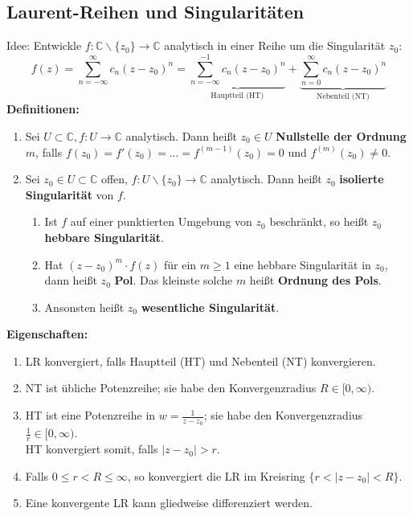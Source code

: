 \documentclass[4pt,a4paper]{scrartcl}
\begin{document}
\begin{multicols}{4}
\subsection{Laurent-Reihen und Singularitäten}
Idee: Entwickle $f:\mathbb{C}\backslash\{z_0\}\rightarrow\mathbb{C}$ analytisch in einer Reihe um die Singularität $z_0$:
\begin{equation*}
f(z)=\sum\limits_{n=-\infty}^{\infty}c_n(z-z_0)^n=\underbrace{\sum\limits_{n=-\infty}^{-1}c_n(z-z_0)^n}_{\text{Hauptteil (HT)}}+\underbrace{\sum\limits_{n=0}^{\infty}c_n(z-z_0)^n}_{\text{Nebenteil (NT)}}
\end{equation*}
\textbf{Definitionen:}
\begin{enumerate}[label=$\bullet$]
\item Sei $U\subset\mathbb{C},f:U\rightarrow\mathbb{C}$ analytisch. Dann heißt $z_0\in U$ \textbf{Nullstelle der Ordnung} $m$, falls $f(z_0)=f'(z_0)=...=f^{(m-1)}(z_0)=0$ und $f^{(m)}(z_0)\neq 0$.
\item Sei $z_0\in U\subset\mathbb{C}$ offen, $f:U\backslash\{z_0\}\rightarrow\mathbb{C}$ analytisch. Dann heißt $z_0$ \textbf{isolierte Singularität} von $f$.
\begin{enumerate}[label=-]
\item Ist $f$ auf einer punktierten Umgebung von $z_0$ beschränkt, so heißt $z_0$ \textbf{hebbare Singularität}.
\item Hat $(z-z_0)^m\cdot f(z)$ für ein $m\geq 1$ eine hebbare Singularität in $z_0$, dann heißt $z_0$ \textbf{Pol}. Das kleinste solche $m$ heißt \textbf{Ordnung des Pols}.
\item Ansonsten heißt $z_0$ \textbf{wesentliche Singularität}.
\end{enumerate}
\end{enumerate}
\textbf{Eigenschaften:}
\begin{enumerate}
\item LR konvergiert, falls Hauptteil (HT) und Nebenteil (NT) konvergieren.
\item NT ist übliche Potenzreihe; sie habe den Konvergenzradius $R\in[0,\infty)$.
\item HT ist eine Potenzreihe in $w=\frac{1}{z-z_0}$; sie habe den Konvergenzradius $\frac{1}{r}\in [0,\infty)$.\\
HT konvergiert somit, falls $|z-z_0|>r$.
\item Falls $0\leq r<R\leq\infty$, so konvergiert die LR im Kreisring $\{r<|z-z_0|<R\}$.
\item Eine konvergente LR kann gliedweise differenziert werden.

\end{enumerate}
\end{multicols}
\end{document}
